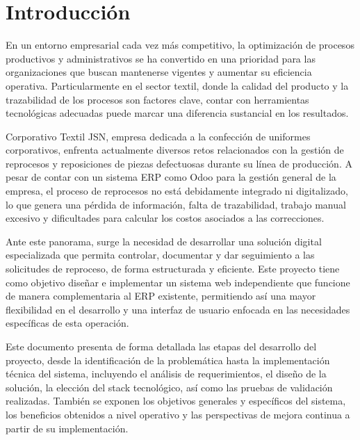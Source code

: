 \documentclass[12pt,letterpaper,spanish]{report}
\begin{document}

\oddsidemargin 0.2in \textwidth 6.5in \topmargin -0.25in
\textheight 9in \pagestyle{myheadings}

\newpage



\chapter{Introducción}
\newpage


En un entorno empresarial cada vez más competitivo, la optimización de procesos productivos y administrativos se ha convertido en una prioridad para las organizaciones que buscan mantenerse vigentes y aumentar su eficiencia operativa. Particularmente en el sector textil, donde la calidad del producto y la trazabilidad de los procesos son factores clave, contar con herramientas tecnológicas adecuadas puede marcar una diferencia sustancial en los resultados.

Corporativo Textil JSN, empresa dedicada a la confección de uniformes corporativos, enfrenta actualmente diversos retos relacionados con la gestión de reprocesos y reposiciones de piezas defectuosas durante su línea de producción. A pesar de contar con un sistema ERP como Odoo para la gestión general de la empresa, el proceso de reprocesos no está debidamente integrado ni digitalizado, lo que genera una pérdida de información, falta de trazabilidad, trabajo manual excesivo y dificultades para calcular los costos asociados a las correcciones.

Ante este panorama, surge la necesidad de desarrollar una solución digital especializada que permita controlar, documentar y dar seguimiento a las solicitudes de reproceso, de forma estructurada y eficiente. Este proyecto tiene como objetivo diseñar e implementar un sistema web independiente que funcione de manera complementaria al ERP existente, permitiendo así una mayor flexibilidad en el desarrollo y una interfaz de usuario enfocada en las necesidades específicas de esta operación.

Este documento presenta de forma detallada las etapas del desarrollo del proyecto, desde la identificación de la problemática hasta la implementación técnica del sistema, incluyendo el análisis de requerimientos, el diseño de la solución, la elección del stack tecnológico, así como las pruebas de validación realizadas. También se exponen los objetivos generales y específicos del sistema, los beneficios obtenidos a nivel operativo y las perspectivas de mejora continua a partir de su implementación.
\end{document}
